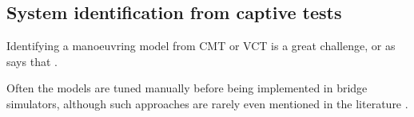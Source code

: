 \subsection{System identification from captive tests} \label{sec:literature_VCT}
Identifying a manoeuvring model from CMT or VCT is a great challenge, or as \textcite{sutulo_algorithm_2014} says that .

Often the models are tuned manually before being implemented in bridge simulators, although such approaches are rarely even mentioned in the literature \cite{sutulo_algorithm_2014}.